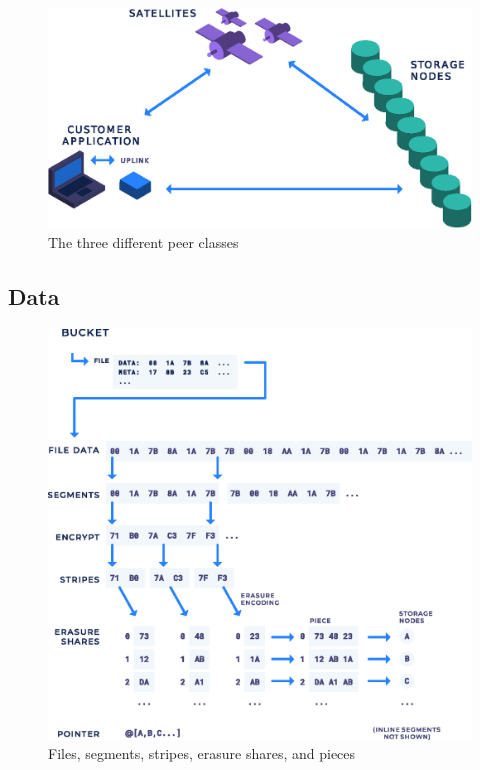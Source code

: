 \documentclass[8pt,fleqn,openany]{book}
\begin{document}
\begin{figure}[!htbp]
\centering
\includegraphics[width=.75\textwidth]{images/overview.eps}
\caption{The three different peer classes}
\end{figure}

\subsection{Data}

\begin{figure}[!htbp]
\centering
\includegraphics[width=\textwidth]{images/structure.eps}
\caption{Files, segments, stripes, erasure shares, and pieces}
\end{figure}
\end{document}
